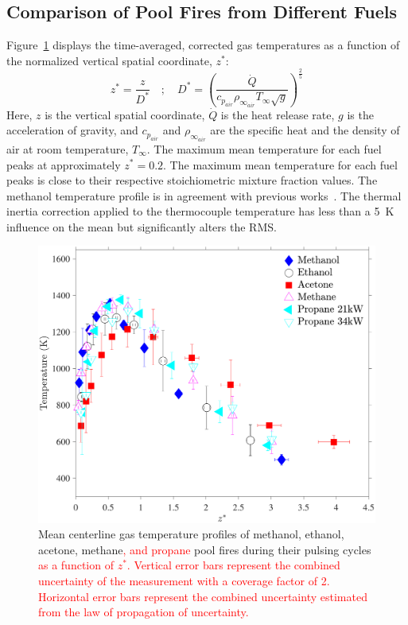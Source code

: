 \documentclass[12pt]{article}
\begin{document}
\subsection{Comparison of Pool Fires from Different Fuels}
\label{ssec:Fuel_comp}

Figure~\ref{fig:Temp_Comparison} displays the time-averaged, corrected gas temperatures as a function of the normalized vertical spatial coordinate, $z^*$:
\begin{equation}\label{eq:Z_Star}
z^*=\frac{z}{D^*}  \quad ; \quad  D^* = \left(\frac{\dot{Q}}{c_{p_{air}} \rho_{\infty_{air}} T_\infty \sqrt{g}}\right)^{\frac{2}{5}}
\end{equation}
Here, $z$ is the vertical spatial coordinate, $\dot{Q}$ is the heat release rate, $g$ is the acceleration of gravity, and ${c_{p_{air}}}$ and $\rho_{\infty_{air}}$ are the specific heat and the density of air at room temperature, $T_\infty$. The maximum mean temperature for each fuel peaks at approximately $z^*=0.2$. The maximum mean temperature for each fuel peaks is close to their respective stoichiometric mixture fraction values. The methanol temperature profile is in agreement with previous works~\cite{Wang2019}. The thermal inertia correction applied to the thermocouple temperature has less than a 5~K influence on the mean but significantly alters the RMS.

\begin{figure}[h!]
	\centering
\includegraphics[width=10.0 cm, keepaspectratio]{Temperature_Comparison.pdf}
	\caption[Mean gas temperature profiles]{Mean centerline gas temperature profiles of methanol, ethanol, acetone, methane\textcolor{red}{, and propane} pool fires during their pulsing cycles \textcolor{red}{ as a function of $z^*$. Vertical error bars represent the combined uncertainty of the measurement with a coverage factor of 2. Horizontal error bars represent the combined uncertainty estimated from the law of propagation of uncertainty.}}
	\label{fig:Temp_Comparison}
\end{figure}
\end{document}
